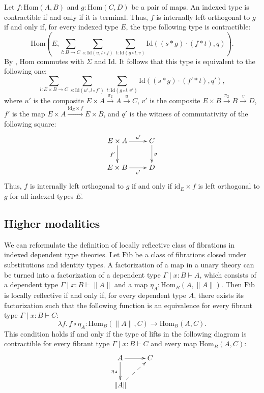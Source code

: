 \documentclass[reqno]{mscs}
\newcommand{\ob}{}
\newcommand{\fs}[1]{\mathrm{#1}}
\newcommand{\Hom}{\fs{Hom}}
\newcommand{\Id}{\fs{Id}}
\newcommand{\id}{\fs{id}}
\newcommand{\Fib}{\fs{Fib}}
\numberwithin{figure}{section}
\begin{document}
Let $f : \Hom(A,B)$ and $g : \Hom(C,D)$ be a pair of maps.
An indexed type is contractible if and only if it is terminal.
Thus, $f$ is internally left orthogonal to $g$ if and only if, for every indexed type $E$, the type following type is contractible:
\[ \Hom(E,\sum_{l : B \to C} \sum_{s : \Id(u, l \circ f)} \sum_{t : \Id(g \circ l, v)} \Id((s * g) \cdot (f * t), q)). \]
By , $\Hom$ commutes with $\Sigma$ and $\Id$.
It follows that this type is equivalent to the following one:
\[ \sum_{l : E \times B \to C} \sum_{s : \Id(u', l \circ f')} \sum_{t : \Id(g \circ l, v')} \Id((s * g) \cdot (f' * t), q'), \]
where $u'$ is the composite $E \times A \xrightarrow{\pi_2} A \xrightarrow{u} C$, $v'$ is the composite $E \times B \xrightarrow{\pi_2} B \xrightarrow{v} D$, $f'$ is the map $E \times A \xrightarrow{\id_E \times f} E \times B$,
and $q'$ is the witness of commutativity of the following square:
\[ \xymatrix{ E \times A \ar[r]^-{u'} \ar[d]_{f'}   & C \ar[d]^g \\
              E \times B \ar[r]_-{v'}               & D
            } \]
Thus, $f$ is internally left orthogonal to $g$ if and only if $\id_E \times f$ is left orthogonal to $g$ for all indexed types $E$.

\subsection{Higher modalities}

We can reformulate the definition of locally reflective class of fibrations in indexed dependent type theories.
Let $\Fib$ be a class of fibrations closed under substitutions and identity types.
A factorization of a map in a unary theory can be turned into a factorization of a dependent type $\Gamma \mid x : B \vdash A \ob$, which consists of a dependent type $\Gamma \mid x : B \vdash \| A \| \ob$ and a map $\eta_A : \Hom_B(A, \| A \|)$.
Then $\Fib$ is locally reflective if and only if, for every dependent type $A$, there exists its factorization such that the following function is an equivalence for every fibrant type $\Gamma \mid x : B \vdash C \ob$:
\[ \lambda f.\, f \circ \eta_A : \Hom_B(\| A \|, C) \to \Hom_B(A, C). \]
This condition holds if and only if the type of lifts in the following diagram is contractible for every fibrant type $\Gamma \mid x : B \vdash C \ob$ and every map $\Hom_B(A,C)$:
\[ \xymatrix{ A \ar[r] \ar[d]_{\eta_A} & C \\
              \| A \| \ar@{-->}[ur]
            } \]
\end{document}

